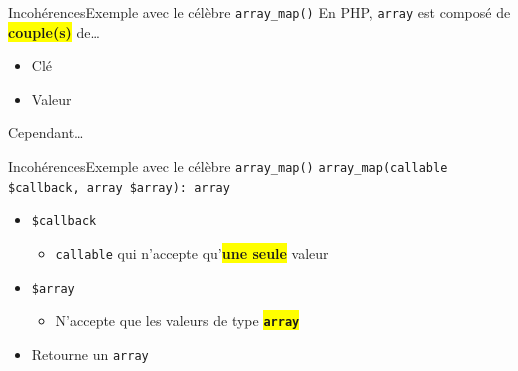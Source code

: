 \begin{frame}{Incohérences}{Exemple avec le célèbre \texttt{array\_map()}}
    En PHP, \texttt{array} est composé de \colorbox{yellow}{\textbf{couple(s)}} de\ldots

    \begin{itemize}[<+->]
        \item<1-> Clé
        \item<2-> Valeur

    \end{itemize}
\end{frame}

\begin{frameC}{Cependant\ldots}

\end{frameC}

\begin{frame}{Incohérences}{Exemple avec le célèbre \texttt{array\_map()}}
    \texttt{array\_map(callable \$callback, array \$array): array}

    \pause

    \begin{itemize}[<+->]
        \item \texttt{\$callback}

        \begin{itemize}[<+->]
            \item \texttt{callable} qui n'accepte qu'\colorbox{yellow}{\textbf{une seule}} valeur
        \end{itemize}

        \item \texttt{\$array}

        \begin{itemize}[<+->]
            \item N'accepte que les valeurs de type \colorbox{yellow}{\texttt{\textbf{array}}}
        \end{itemize}

        \item Retourne un \texttt{array}
    \end{itemize}

\end{frame}

